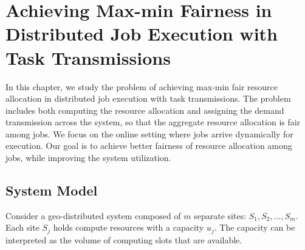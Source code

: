 \chapter[Achieving Max-min Fairness in Distributed Job Execution with Task Transmissions]{Achieving Max-min Fairness in Distributed Job Execution with Task Transmissions}
\label{ch:DAMF}

In this chapter, we study the problem of achieving max-min fair resource allocation in distributed job execution with task transmissions. The problem includes both computing the resource allocation and assigning the demand transmission across the system, so that the aggregate resource allocation is fair among jobs. We focus on the online setting where jobs arrive dynamically for execution. Our goal is to achieve better fairness of resource allocation among jobs, while improving the system utilization.


\section{System Model}
\label{sec:model_1}
Consider a geo-distributed system composed of $m$ separate sites: $S_1, S_2, ..., S_m$. Each site $S_j$ holds compute resources with a capacity $u_j$. The capacity can be interpreted as the volume of computing slots that are available.

